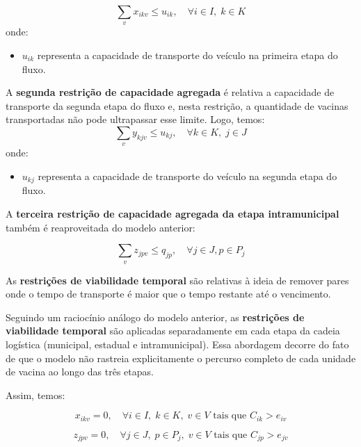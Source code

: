 \begin{equation*}
\sum_{v} x_{ikv} \le u_{ik}, \quad \forall i \in I, \; k \in K
\end{equation*}
onde:
\begin{itemize}
    \item $u_{ik}$ representa a capacidade de transporte do veículo na primeira etapa do fluxo.
\end{itemize}

A \textbf{segunda restrição de capacidade agregada} é relativa a capacidade de transporte da segunda etapa do fluxo e, nesta restrição, a quantidade de vacinas transportadas não pode ultrapassar esse limite. Logo, temos:
\begin{equation*}
\sum_{v} y_{kjv} \le u_{kj}, \quad \forall k \in K, \; j \in J
\end{equation*}
onde:
\begin{itemize}
    \item $u_{kj}$ representa a capacidade de transporte do veículo na segunda etapa do fluxo.
\end{itemize}

A \textbf{terceira restrição de capacidade agregada da etapa intramunicipal} também é reaproveitada do modelo anterior:

\begin{equation*}
\sum_{v} z_{jpv} \le q_{jp}, \quad \forall j \in J, p \in P_j
\end{equation*}

As \textbf{restrições de viabilidade temporal} são relativas à ideia de remover pares onde o tempo de transporte é maior que o tempo restante até o vencimento. 

Seguindo um raciocínio análogo do modelo anterior, as \textbf{restrições de viabilidade temporal} são aplicadas separadamente em cada etapa da cadeia logística (municipal, estadual e intramunicipal). Essa abordagem decorre do fato de que o modelo não rastreia explicitamente o percurso completo de cada unidade de vacina ao longo das três etapas.

Assim, temos:

\begin{equation*}
    x_{ikv} = 0, \quad \forall i \in I, \; k \in K, \; v \in V \text{ tais que } C_{ik} > e_{iv}
\end{equation*}

\begin{equation*}
    z_{jpv} = 0, \quad \forall j \in J, \; p \in P_j, \; v \in V \text{ tais que } C_{jp} > e_{jv}
\end{equation*}

